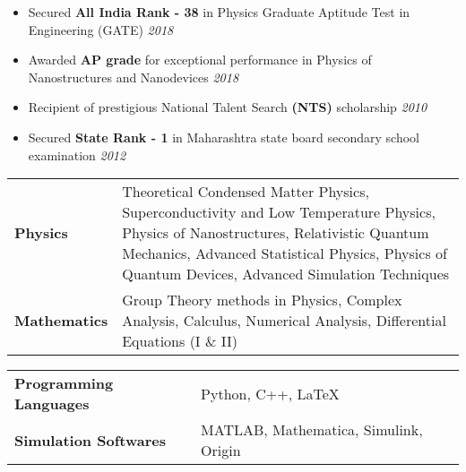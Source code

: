 \documentclass[10pt]{article}%
\newcommand{\xfilll}[2][1ex]{
\dimen0=#2\advance\dimen0 by #1
\leaders\hrule height \dimen0 depth -#1\hfill}
\begin{document}
{\begin{itemize}
\end{itemize}
\vspace{-4mm}
\begin{itemize}
 \setlength\itemsep{0.01em}

\item Secured \textbf{All India Rank - 38} in Physics Graduate Aptitude Test in Engineering (GATE) \hfill\textit{2018} 
\item Awarded \textbf{AP grade} for exceptional performance in Physics of Nanostructures and Nanodevices \hfill\textit{2018}
\item Recipient of prestigious National Talent Search \textbf{(NTS)} scholarship  \hfill\textit{2010}
\item Secured \textbf{State Rank - 1} in Maharashtra state board secondary school examination \hfill\textit{2012}

\end{itemize}
  
\begin{tabular}{ l p{13cm}}
    
    \textbf{Physics} & Theoretical Condensed Matter Physics, Superconductivity and Low Temperature Physics, Physics of Nanostructures, Relativistic Quantum Mechanics, Advanced Statistical Physics, Physics of Quantum Devices, Advanced Simulation Techniques \vspace{2mm}    \\ 
    \textbf{Mathematics} & Group Theory methods in Physics, Complex Analysis, Calculus, Numerical Analysis, Differential Equations (I \& II) \\ 
\end{tabular}
\begin{tabular}{l l}

\textbf{Programming Languages} & Python, C++,  \LaTeX  \vspace{4pt}\\
\textbf{Simulation Softwares} & MATLAB, Mathematica, Simulink, Origin
\end{tabular} 

}
\end{document}
